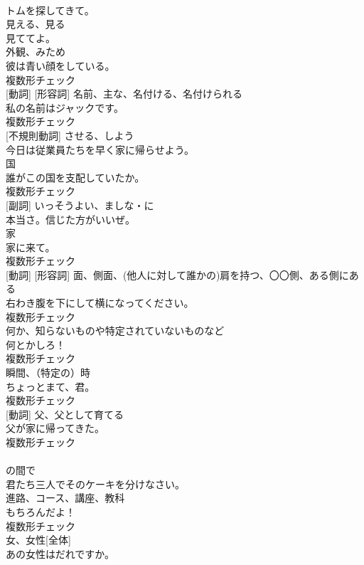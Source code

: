\documentclass[8pt]{extreport}
\begin{document}
\begin{CJK}{UTF8}{min}
\\	トムを探してきて。	
\\	[動詞]	見える、見る	
\\	見ててよ。	
\\	[名詞]	外観、みため	
\\	彼は青い顔をしている。	
\\	複数形チェック
\\	[名詞] [動詞] [形容詞]	名前、主な、名付ける、名付けられる	
\\	私の名前はジャックです。	
\\	複数形チェック
\\	[動詞] [不規則動詞]	させる、しよう	
\\	今日は従業員たちを早く家に帰らせよう。	
\\	[名詞]	国	
\\	誰がこの国を支配していたか。	
\\	複数形チェック
\\	[形容詞] [副詞]	いっそうよい、ましな・に	
\\	本当さ。信じた方がいいぜ。	
\\	[名詞]	家	
\\	家に来て。	
\\	複数形チェック
\\	[名詞] [動詞] [形容詞]	面、側面、(他人に対して誰かの)肩を持つ、〇〇側、ある側にある	
\\	右わき腹を下にして横になってください。	
\\	複数形チェック
\\	[名詞]	何か、知らないものや特定されていないものなど	
\\	何とかしろ！	
\\	複数形チェック
\\	[名詞]	瞬間、（特定の）時	
\\	ちょっとまて、君。	
\\	複数形チェック
\\	[名詞] [動詞]	父、父として育てる	
\\	父が家に帰ってきた。	
\\	複数形チェック
\\	[前置詞]	
\\	の間で	
\\	君たち三人でそのケーキを分けなさい。	
\\	[名詞]	進路、コース、講座、教科	
\\	もちろんだよ！	
\\	複数形チェック
\\	[名詞]	女、女性[全体]	
\\	あの女性はだれですか。	

\end{CJK}
\end{document}
